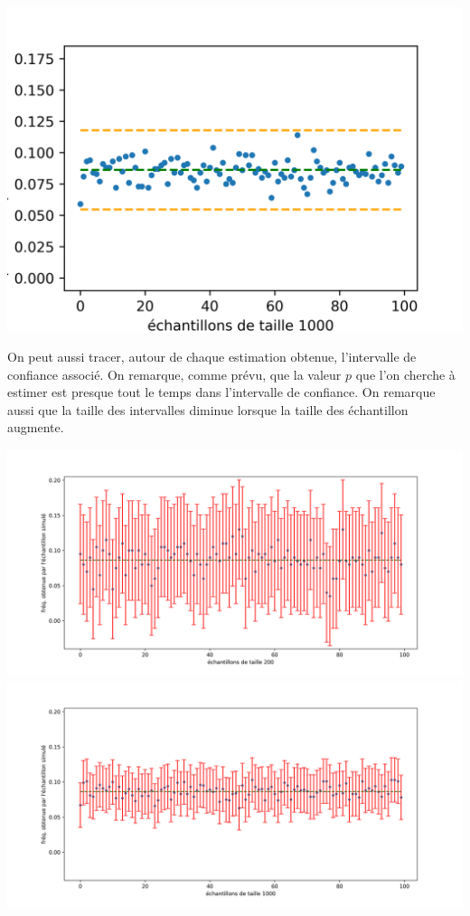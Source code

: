 \documentclass[11pt]{article}
\begin{document}
\begin{center}
  \includegraphics[scale=.7]{simul_multiple-2.png}
\end{center}
On peut aussi tracer, autour de chaque estimation obtenue, l'intervalle de
confiance associé. On remarque, comme prévu, que la valeur $p$ que l'on
cherche à estimer est presque tout le temps dans l'intervalle de confiance. On
remarque aussi que la taille des intervalles diminue lorsque la taille des
échantillon augmente.

\begin{center}
  \includegraphics[scale=.6]{simul_multiple_confiance_theorie-0.png}
  \includegraphics[scale=.6]{simul_multiple_confiance_theorie-2.png}
\end{center}
\end{document}
